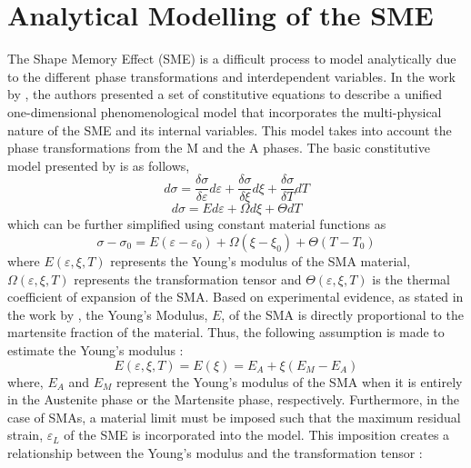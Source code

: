 \section{Analytical Modelling of the SME}
The Shape Memory Effect (SME) is a difficult process to model analytically due to the different phase transformations and interdependent variables. In the work by \cite{liangConstitutiveModelingShape1990a}, the authors presented a set of constitutive equations to describe a unified one-dimensional phenomenological model that incorporates the multi-physical nature of the SME and its internal variables. This model takes into account the phase transformations from the M and the A phases. The basic constitutive model presented by \cite{liangConstitutiveModelingShape1990a} is as follows,
\begin{equation}
  \label{eq:liang_model_1}
  d\sigma = \frac{\delta\sigma}{\delta\varepsilon}d\varepsilon + \frac{\delta\sigma}{\delta\xi}d\xi + \frac{\delta\sigma}{\delta T}dT
\end{equation}
\begin{equation}
  \label{eq:liang_model_2}
  d\sigma = Ed\varepsilon + \Omega d\xi + \Theta dT
\end{equation}
 which can be further simplified using constant material functions as
\begin{equation}
  \label{eq:liang_model_3}
  \sigma-\sigma_0 = E(\varepsilon-\varepsilon_0) + \Omega(\xi-\xi_0) + \Theta(T-T_0)
\end{equation}
where $E(\varepsilon,\xi,T)$ represents the Young's modulus of the SMA material, $\Omega(\varepsilon,\xi,T)$ represents the transformation tensor and $\Theta(\varepsilon,\xi,T)$ is the thermal coefficient of expansion of the SMA. Based on experimental evidence, as stated in the work by \cite{liangConstitutiveModelingShape1990a}, the Young's Modulus, $E$, of the SMA is directly proportional to the martensite fraction of the material. Thus, the following assumption is made to estimate the Young's modulus :
\begin{equation}
  \label{eq:youngs-modulus}
  E(\varepsilon,\xi,T) = E(\xi) = E_A + \xi(E_M-E_A)
\end{equation}
where, $E_A$ and $E_M$ represent the Young's modulus of the SMA when it is entirely in the Austenite phase or the Martensite phase, respectively. Furthermore, in the case of SMAs, a material limit must be imposed such that the maximum residual strain, $\varepsilon_L$ of the SME is incorporated into the model. This imposition creates a relationship between the Young's modulus and the transformation tensor :
